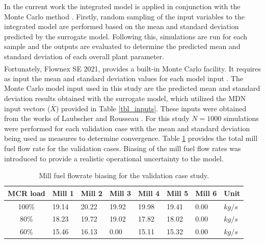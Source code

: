 \documentclass[a4paper,fleqn]{cas-sc}
\begin{document}
In the current work the integrated model is applied in conjunction with the Monte Carlo method \cite{Thomopoulos2013}. Firstly, random sampling of the input variables to the integrated model are performed based on the mean and standard deviation predicted by the surrogate model.  Following this, simulations are run for each sample and the outputs are evaluated to determine the predicted mean and standard deviation of each overall plant parameter.\\

Fortunately, Flownex SE\textsuperscript{\textregistered} 2021, provides a built-in Monte Carlo facility. It requires as input the mean and standard deviation values for each model input \cite{flownex}. The Monte Carlo model input used in this study are the predicted mean and standard deviation results obtained with the surrogate model, which utilized the MDN input vectors ($\overline{X}$) provided in Table \ref{tbl_inputs}. These inputs were obtained from the works of Laubscher and Rousseau \cite{Laubscher2019b}. For this study $N=1000$ simulations were performed for each validation case with the mean and standard deviation being used as measures to determine convergence. Table \ref{tbl_fuel_bias} provides the total mill fuel flow rate for the validation cases. Biasing of the mill fuel flow rates was introduced to provide a realistic operational uncertainty to the model.\\

\begin{table}[h!]
\caption{Mill fuel flowrate biasing for the validation case study.}\label{tbl_fuel_bias}
\begin{tabular*}{\tblwidth}{c p{}p{}p{}p{}p{}p{}p{}}
\toprule
 MCR load& Mill 1 & Mill 2 &Mill 3 &Mill 4 &Mill 5 &Mill 6 & Unit \\ %
\midrule
 100\% & 19.14 & 20.22 & 19.92 & 19.98 & 19.41 & 0.00 & $kg/s$  \\
 80\% & 18.23 & 19.72 & 19.02 & 17.82 & 18.02 & 0.00 & $kg/s$  \\
 60\% & 15.46 & 16.13 & 0.00 & 15.11 & 15.32 & 0.00 & $kg/s$  \\
\bottomrule
\end{tabular*}
\end{table}  
\end{document}
